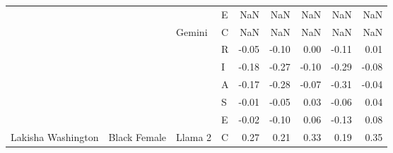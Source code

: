 \begin{table}
\begin{tabular}[t]{llllrrrrr}
 &  &  & E & NaN & NaN & NaN & NaN & NaN\\

 &  & \multirow[t]{-6}{*}{\raggedright\arraybackslash Gemini} & C & NaN & NaN & NaN & NaN & NaN\\

 &  &  & R & -0.05 & -0.10 & 0.00 & -0.11 & 0.01\\

 &  &  & I & -0.18 & -0.27 & -0.10 & -0.29 & -0.08\\

 &  &  & A & -0.17 & -0.28 & -0.07 & -0.31 & -0.04\\

 &  &  & S & -0.01 & -0.05 & 0.03 & -0.06 & 0.04\\

 &  &  & E & -0.02 & -0.10 & 0.06 & -0.13 & 0.08\\

\multirow[t]{-24}{*}{\raggedright\arraybackslash Lakisha Washington} & \multirow[t]{-24}{*}{\raggedright\arraybackslash Black Female} & \multirow[t]{-6}{*}{\raggedright\arraybackslash Llama 2} & C & 0.27 & 0.21 & 0.33 & 0.19 & 0.35\\
\bottomrule
\end{tabular}
\end{table}
